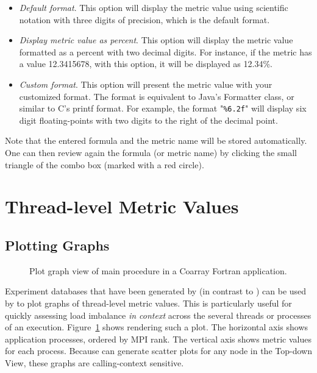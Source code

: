 \begin{itemize}
\begin{itemize}
\item \textit{Default format}. This option will display the metric value using scientific notation with three digits of precision, which is the default format.

\item \textit{Display metric value as percent}. This option will display the metric value formatted as a percent with two decimal digits. For instance, if the metric has a value 12.3415678, with this option, it will be displayed as 12.34\%.

\item \textit{Custom format}. This option will present the metric value with your customized format. The format is equivalent to Java's Formatter class, or similar to C's printf format. For example, the format "\texttt{\%6.2f}" will display six digit floating-points with two digits to the right of the decimal point.

\end{itemize}

\end{itemize}

Note that the entered formula and the metric name will be stored automatically.
One can then review again the formula (or metric name) by clicking the small triangle of the combo box (marked with a red circle).



\section{Thread-level Metric Values}
\label{sec:hpcviewer:thread-level}

\subsection{Plotting Graphs}
\label{sec:hpcviewer:plots}
\begin{figure}[t]
\caption{Plot graph view of main procedure in a Coarray Fortran application.}
\label{fig:hpcviewer-view-scatterplot}
\end{figure}


\HPCToolkit{} Experiment databases that have been generated by \hpcprofmpi{} (in contrast to \hpcprof{}) can be used by \hpcviewer{} to plot graphs of thread-level metric values.
This is particularly useful for quickly assessing load imbalance \emph{in context} across the several threads or processes of an execution.
Figure~\ref{fig:hpcviewer-view-scatterplot} shows \hpcviewer{} rendering such a plot.
The horizontal axis shows application processes, ordered by MPI rank.
The vertical axis shows metric values for each process.
Because \hpcviewer{} can generate scatter plots for any node in the Top-down View, these graphs are calling-context sensitive.

